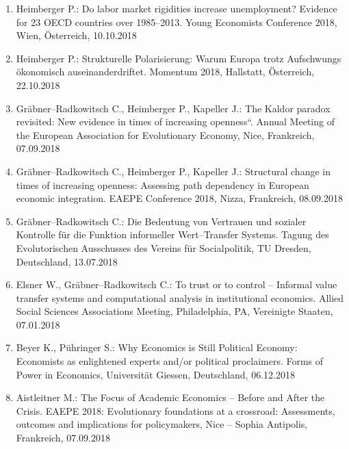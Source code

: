 \begin{enumerate}
	\item Heimberger P.: Do labor market rigidities increase unemployment? Evidence for 23 OECD countries over 1985--2013. Young Economists Conference 2018, Wien, Österreich, 10.10.2018
	\item Heimberger P.: Strukturelle Polarisierung: Warum Europa trotz Aufschwungs ökonomisch auseinanderdriftet. Momentum 2018, Hallstatt, Österreich, 22.10.2018
	\item Gräbner--Radkowitsch C., Heimberger P., Kapeller J.: The Kaldor paradox revisited: New evidence in times of increasing openness“. Annual Meeting of the European Association for Evolutionary Economy, Nice, Frankreich, 07.09.2018
	\item Gräbner--Radkowitsch C., Heimberger P., Kapeller J.: Structural change in times of increasing openness: Assessing path dependency in European economic integration. EAEPE Conference 2018, Nizza, Frankreich, 08.09.2018
	\item Gräbner--Radkowitsch C.: Die Bedeutung von Vertrauen und sozialer Kontrolle für die Funktion informeller Wert--Transfer Systems. Tagung des Evolutorischen Ausschusses des Vereins für Socialpolitik, TU Dresden, Deutschland, 13.07.2018
	\item Elsner W., Gräbner--Radkowitsch C.: To trust or to control -- Informal value transfer systems and computational analysis in institutional economics. Allied Social Sciences Associations Meeting, Philadelphia, PA, Vereinigte Staaten, 07.01.2018
	\item Beyer K., Pühringer S.: Why Economics is Still Political Economy: Economists as enlightened experts and/or political proclaimers. Forms of Power in Economics, Universität Giessen, Deutschland, 06.12.2018
	\item Aistleitner M.: The Focus of Academic Economics -- Before and After the Crisis. EAEPE 2018: Evolutionary foundations at a crossroad: Assessments, outcomes and implications for policymakers, Nice -- Sophia Antipolis, Frankreich, 07.09.2018
\end{enumerate}
